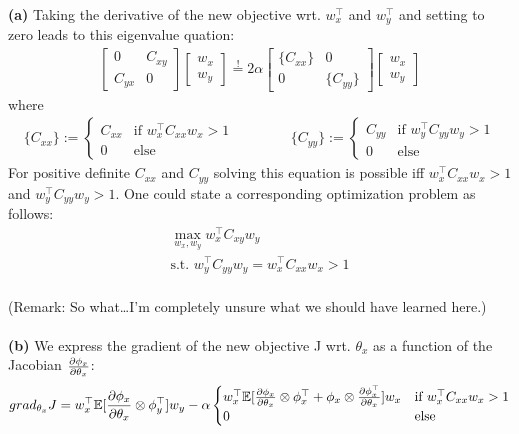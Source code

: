 \documentclass[a4paper]{article}
\newcommand{\eqq}{  \overset{\text{!}}{=} }
\newcommand{\wx}{{w_{x}}}
\newcommand{\wy}{{w_{y}}}
\newcommand{\wxt}{w_{x}^\top}
\newcommand{\wyt}{w_{y}^\top}
\newcommand{\Cxx}{C_{xx}}
\newcommand{\Cxy}{C_{xy}}
\newcommand{\Cyx}{C_{yx}}
\newcommand{\Cyy}{C_{yy}}
\newcommand{\1}{\mathds{1}}
\begin{document}
\textbf{(a)} Taking the derivative of the new objective wrt. $\wxt$ and $\wyt$ and setting to 
zero leads to this eigenvalue quation: 
\begin{align*}
	\begin{bmatrix}
	0 & \Cxy \\
	\Cyx & 0 
	\end{bmatrix}
	\begin{bmatrix}
	 \wx  \\
	 \wy
	\end{bmatrix}
\eqq	 
	2\alpha		
	\begin{bmatrix}
	\{\Cxx\} & 0 \\
	0 & \{\Cyy\}   
	\end{bmatrix}
	\begin{bmatrix}
	 \wx  \\
	 \wy
	\end{bmatrix}	
\end{align*}
where
\begin{align*} 
	\{\Cxx\} := \begin{cases} \Cxx &\text{if } \wxt\Cxx\wx > 1\\ 0 &\text{else} \end{cases}
	\quad\quad\quad\quad
	\{\Cyy\} := \begin{cases} \Cyy &\text{if } \wyt\Cyy\wy > 1\\ 0 &\text{else} \end{cases}
\end{align*}
For positive definite $\Cxx$ and $\Cyy$ solving this equation is possible
iff $\wxt\Cxx\wx > 1$ and $\wyt\Cyy\wy > 1$. 
One could state a corresponding optimization problem as follows: 
\begin{gather*}
	\max_{\wx,\wy} \wxt\Cxy\wy \\ 
	\text{s.t. } \wyt\Cyy\wy = \wxt C_{xx} \wx > 1 
\end{gather*}
\\
(Remark: So what\ldots I'm completely unsure what we should have learned here.)
\\
\\
\textbf{(b)}
We express the gradient of the new objective J wrt. $\theta_x$
as a function of the Jacobian ${\partial\phi_x\over\partial\theta_x}$:\\
\begin{gather*}
grad_{\theta_x}J 
= 
\wxt\mathbb{E}[{ {\partial\phi_x\over\partial\theta_x}\otimes \phi^\top_y }]\wy
- \alpha 
	\begin{cases} \wxt
	\mathbb{E}[{ {\partial\phi_x\over\partial\theta_x} \otimes \phi^\top_x} + { \phi_x \otimes{\partial\phi_x^\top\over\partial\theta_x} } ]
	\wx &\text{if } \wxt\Cxx\wx > 1\\ 0 &\text{else} \end{cases}
\end{gather*}
\end{document}
